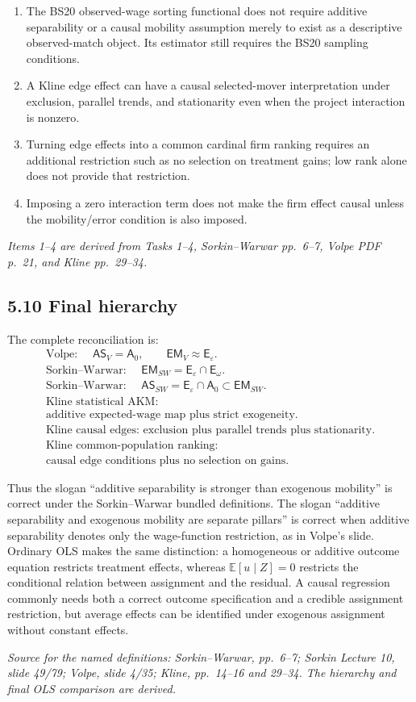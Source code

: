 \documentclass[11pt]{article}
\begin{document}
\begin{enumerate}
\item The BS20 observed-wage sorting functional does not require additive
  separability or a causal mobility assumption merely to exist as a
  descriptive observed-match object.  Its estimator still requires the
  BS20 sampling conditions.
\item A Kline edge effect can have a causal selected-mover interpretation
  under exclusion, parallel trends, and stationarity even when the project
  interaction is nonzero.
\item Turning edge effects into a common cardinal firm ranking requires an
  additional restriction such as no selection on treatment gains; low rank
  alone does not provide that restriction.
\item Imposing a zero interaction term does not make the firm effect causal
  unless the mobility/error condition is also imposed.
\end{enumerate}

\textit{Items 1--4 are derived from Tasks 1--4, Sorkin--Warwar pp.\ 6--7,
Volpe PDF p.\ 21, and Kline pp.\ 29--34.}

\subsection{5.10 Final hierarchy}

The complete reconciliation is:
\[
\boxed{
\begin{array}{c}
\text{Volpe: }\quad
\mathsf{AS}_{V}=\mathsf A_0,\qquad
\mathsf{EM}_{V}\approx\mathsf E_\varepsilon.\\[0.25em]
\text{Sorkin--Warwar: }\quad
\mathsf{EM}_{SW}=\mathsf E_\varepsilon\cap\mathsf E_\omega.\\[0.25em]
\text{Sorkin--Warwar: }\quad
\mathsf{AS}_{SW}=\mathsf E_\varepsilon\cap\mathsf A_0
\subset\mathsf{EM}_{SW}.\\[0.25em]
\text{Kline statistical AKM:}\\
\text{additive expected-wage map plus strict exogeneity.}\\[0.25em]
\text{Kline causal edges: exclusion plus parallel trends plus
stationarity.}\\[0.25em]
\text{Kline common-population ranking:}\\
\text{causal edge conditions plus no selection on gains.}
\end{array}}
\tag{T5.45}
\]

Thus the slogan ``additive separability is stronger than exogenous
mobility'' is correct under the Sorkin--Warwar bundled definitions.  The
slogan ``additive separability and exogenous mobility are separate pillars''
is correct when additive separability denotes only the wage-function
restriction, as in Volpe's slide.  Ordinary OLS makes the same distinction:
a homogeneous or additive outcome equation restricts treatment effects,
whereas \(\mathbb E[u\mid Z]=0\) restricts the conditional relation between
assignment and the residual.  A causal regression commonly needs both a
correct outcome specification and a credible assignment restriction, but
average effects can be identified under exogenous assignment without
constant effects.

\textit{Source for the named definitions: Sorkin--Warwar, pp.\ 6--7;
Sorkin Lecture 10, slide 49/79; Volpe, slide 4/35; Kline, pp.\ 14--16 and
29--34.  The hierarchy and final OLS comparison are derived.}
\end{document}

